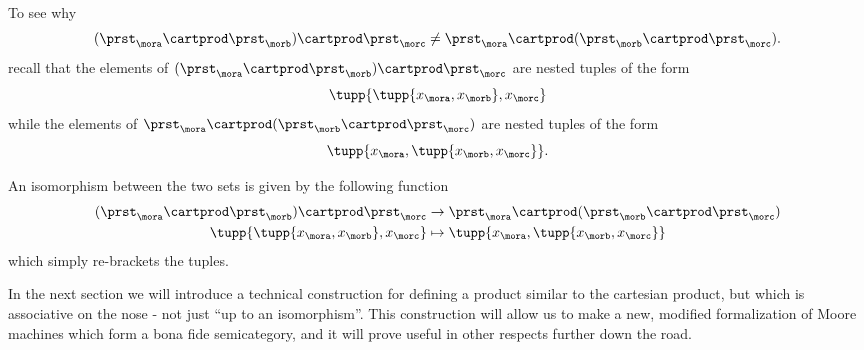 To see why
\begin{equation}
    \label{eq:assoc-fails1}
    (\prst_{\mora} \cartprod \prst_{\morb}) \cartprod \prst_{\morc} \neq \prst_{\mora} \cartprod (\prst_{\morb} \cartprod \prst_{\morc}).
\end{equation}
recall that the elements of $(\prst_{\mora} \cartprod \prst_{\morb}) \cartprod \prst_{\morc}$ are nested tuples of the form
$$\tupp{ \tupp{x_{\mora}, x_{\morb}}, x_{\morc} }$$ while the elements of $\prst_{\mora} \cartprod (\prst_{\morb} \cartprod \prst_{\morc})$ are nested tuples of the form $$\tupp{x_{\mora}, \tupp{x_{\morb}, x_{\morc}} }.$$

An isomorphism between the two sets is given by the following function
\begin{equation}
    \label{eq:assoc-fails2}
    \begin{aligned}
        (\prst_{\mora} \cartprod \prst_{\morb}) \cartprod \prst_{\morc} & \to \prst_{\mora} \cartprod (\prst_{\morb} \cartprod \prst_{\morc}) \\
        \tupp{ \tupp{x_{\mora}, x_{\morb}}, x_{\morc} }                 & \mapsto \tupp{x_{\mora}, \tupp{x_{\morb}, x_{\morc}} }
    \end{aligned}
\end{equation}
which simply re-brackets the tuples.

In the next section we will introduce a technical construction for defining a product similar to the cartesian product, but which is associative on the nose - not just ``up to an isomorphism''.
This construction will allow us to make a new, modified formalization of Moore machines which form a bona fide semicategory, and it will prove useful in other respects further down the road.
